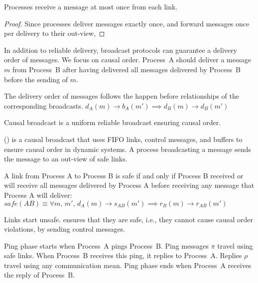 \begin{lemma}
  Processes receive a message at most once from each link. 
\end{lemma}

\begin{proof}
  Since processes deliver messages exactly once, and forward messages once per
  delivery to their out-view, 
\end{proof}

In addition to reliable delivery, broadcast protocols can guarantee a delivery
order of messages. We focus on causal order. Process~A should deliver a message
$m$ from Process~B after having delivered all messages delivered by Process~B
before the sending of $m$.

\begin{definition}
  The delivery order of messages follows the happen before relationships of the
  corresponding broadcasts.
  $d_A(m) \rightarrow b_A(m') \implies d_B(m) \rightarrow d_B(m')$
\end{definition}

\begin{definition}
  Causal broadcast is a uniform reliable broadcast ensuring causal order.
\end{definition}

\PCBROADCAST (\REF) is a causal broadcast that uses  FIFO
links, control messages, and buffers to ensure causal order in dynamic
systems. A process broadcasting a message sends the message to an out-view of
safe links.

\begin{definition} 
  A link from Process A to Process B is safe if and only if Process B received
  or will receive all messages delivered by Process A before receiving any
  message that Process A will
  deliver: $safe(AB) \equiv \forall m,\, m',\, d_A(m) \rightarrow s_{AB}(m')
  \implies r_B(m) \rightarrow r_{AB}(m')$
\end{definition}

Links start unsafe. \PCBROADCAST ensures that they are safe, i.e., they cannot
cause causal order violations, by sending control messages.

\begin{definition}
  Ping phase starts when Process~A pings Process~B. Ping messages $\pi$ travel
  using safe links. When Process~B receives this ping, it replies to
  Process~A. Replies $\rho$ travel using any communication mean. Ping phase ends
  when Process~A receives the reply of Process~B.
\end{definition}

